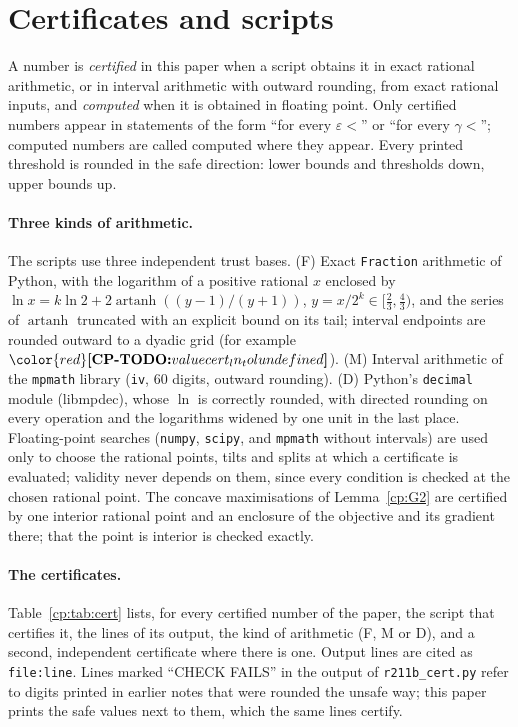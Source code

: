 \documentclass[11pt]{article}
\makeatletter
\theoremstyle{definition}
\theoremstyle{remark}
\DeclareRobustCommand{\CPTODO}[1]{{\color{red}\textbf{[CP-TODO:} #1\textbf{]}}}
\providecommand{\eps}{\varepsilon}
\newcommand{\cpv}[1]{\ifcsname cpv@#1\endcsname\csname cpv@#1\endcsname\else\CPTODO{value #1 undefined}\fi}
\makeatother
\begin{document}
\section{Certificates and scripts}\label{cp:sec:certificates}

A number is \emph{certified} in this paper when a script obtains it in exact rational arithmetic, or in interval arithmetic with outward rounding, from exact rational inputs, and \emph{computed} when it is obtained in floating point. Only certified numbers appear in statements of the form ``for every $\eps<$'' or ``for every $\gamma<$''; computed numbers are called computed where they appear. Every printed threshold is rounded in the safe direction: lower bounds and thresholds down, upper bounds up.

\paragraph{Three kinds of arithmetic.} The scripts use three independent trust bases. (F) Exact \texttt{Fraction} arithmetic of Python, with the logarithm of a positive rational $x$ enclosed by $\ln x=k\ln2+2\operatorname{artanh}((y-1)/(y+1))$, $y=x/2^k\in[\frac23,\frac43)$, and the series of $\operatorname{artanh}$ truncated with an explicit bound on its tail; interval endpoints are rounded outward to a dyadic grid (for example $\cpv{cert_ln_tol}$). (M) Interval arithmetic of the \texttt{mpmath} library (\texttt{iv}, 60 digits, outward rounding). (D) Python's \texttt{decimal} module (libmpdec), whose $\ln$ is correctly rounded, with directed rounding on every operation and the logarithms widened by one unit in the last place. Floating-point searches (\texttt{numpy}, \texttt{scipy}, and \texttt{mpmath} without intervals) are used only to choose the rational points, tilts and splits at which a certificate is evaluated; validity never depends on them, since every condition is checked at the chosen rational point. The concave maximisations of Lemma~\ref{cp:G2} are certified by one interior rational point and an enclosure of the objective and its gradient there; that the point is interior is checked exactly.

\paragraph{The certificates.} Table~\ref{cp:tab:cert} lists, for every certified number of the paper, the script that certifies it, the lines of its output, the kind of arithmetic (F, M or D), and a second, independent certificate where there is one. Output lines are cited as \texttt{file:line}. Lines marked ``CHECK FAILS'' in the output of \texttt{r211b\_\allowbreak{}cert.\allowbreak{}py} refer to digits printed in earlier notes that were rounded the unsafe way; this paper prints the safe values next to them, which the same lines certify.
\end{document}
